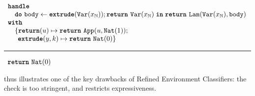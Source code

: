 \begin{code}
  \begin{efflst}
    $\begin{array}{l}
      \textbf{\texttt{handle}} \\
      \quad \texttt{\textbf{do}} \,\, {\texttt{body}} \leftarrow {\textbf{\texttt{extrude}}({\texttt{Var}(x_{\mathbb{N}})}); \texttt{\textbf{return}} \,\, {\texttt{Var}(x_{\mathbb{N}})}} \; \textbf{\texttt{in}} \; {\texttt{\textbf{return}} \,\, {\texttt{Lam}(\texttt{Var}(x_{\mathbb{N}}), \texttt{body})}} \\
      \textbf{\texttt{with}} \\
      \quad \{ \textbf{\texttt{return}}(u) \mapsto \texttt{\textbf{return}} \,\, {\texttt{App}(u, \texttt{Nat}(1))}; \\
      \quad \; \, \textbf{\texttt{extrude}}(y, k) \mapsto { \texttt{\textbf{return}} \,\, {\texttt{Nat}(0)}} \}\\
    \end{array}$

    \vspace{2mm} 
\textcolor{effComment}{\hrule height 0.2mm \relax}
\vspace{2mm} 

\textcolor{effComment}{$\begin{array}{l}\texttt{\textbf{return}} \,\, {\texttt{Nat}(0)}\end{array}$}

\end{efflst}
%
\label{listing:efflang-no-scope-extrusion}
\end{code}

 thus illustrates one of the key drawbacks of Refined Environment Classifiers: the check is too stringent, and restricts expressiveness. 